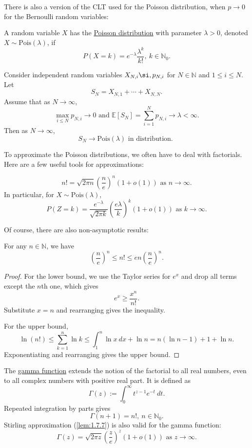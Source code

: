 There is also a version of the CLT used for the Poisson distribution, when $p \to 0$ for the Bernoulli 
random variables: 

\begin{definition}[]
\label{def:1.7.5}
A random variable $X$ has the \underline{Poisson distribution} with parameter $\lambda > 0$, denoted 
$X \sim \text{Pois}(\lambda)$, if 
\[ P(X = k) = e^{-\lambda} \frac{\lambda^k}{k!}, \ k \in \mathbb{N}_0. \]
\end{definition}

\begin{theorem}
\label{thm:1.7.6}
Consider independent random variables $X_{N, i} \si, p_{N, i}$ for $N \in \mathbb{N}$ and $1 \leq i \leq N$. 
Let 
\[ S_N = X_{N, 1} + \cdots + X_{N, N}. \]
Assume that as $N \to \infty$, 
\[ \max_{i \leq N} p_{N, i} \to 0 \text{  and  } \mathbb{E}[S_N] = \sum_{i = 1}^{N} p_{N, i} 
\to \lambda < \infty. \]
Then as $N \to \infty$, 
\[ S_N \to \text{Pois}(\lambda) \text{ in distribution. } \]
\end{theorem}

To approximate the Poisson distributions, we often have to deal with factorials. Here are a few useful tools 
for approximations:
\begin{lemma}
\label{lem:1.7.7}
\[ n! = \sqrt{2 \pi n} \left( \frac{n}{e} \right)^n (1 + o(1)) \text{ as } n\to \infty. \]
In particular, for $X \sim \text{Pois}(\lambda)$, 
\[ P(Z = k) = \frac{e^{-\lambda}}{\sqrt{2 \pi k}} \left( \frac{e \lambda}{k} \right)^k (1 + o(1)) 
\text{ as } k \to \infty. \]
\end{lemma}

Of course, there are also non-asymptotic results:
\begin{lemma}
\label{lem:1.7.8}
For any $n \in \mathbb{N}$, we have 
\[ \left( \frac{n}{e} \right)^n \leq n! \leq en \left( \frac{n}{e} \right)^n. \]
\end{lemma}

\begin{proof}
For the lower bound, we use the Taylor series for $e^x$ and drop all terms except the $n$th one, which 
gives 
\[ e^x \geq \frac{x^n}{n!}. \]
Substitute $x = n$ and rearranging gives the inequality.

For the upper bound, 
\[ \ln{(n!)} \leq \sum_{k = 1}^{n} \ln{k} \leq \int_{1}^{n} \ln{x} \ dx + \ln{n} 
= n(\ln{n} - 1) + 1 + \ln{n}. \]
Exponentiating and rearranging gives the upper bound.
\end{proof}

\begin{remark}
\label{rmk:1.7.9}
The \underline{gamma function} extends the notion of the factorial to all real numbers, even to all 
complex numbers with positive real part. It is defined as 
\[ \Gamma(z) := \int_{0}^{\infty} t^{z - 1}e^{-t} \ dt. \]
Repeated integration by parts gives 
\[ \Gamma(n + 1) = n!, \ n \in \mathbb{N}_0. \]
Stirling approximation (\cref{lem:1.7.7}) is also valid for the gamma function:
\[ \Gamma(z) = \sqrt{2 \pi z} \left( \frac{z}{e} \right)^z (1 + o(1)) \text{ as } z \to \infty. \]
\end{remark}

